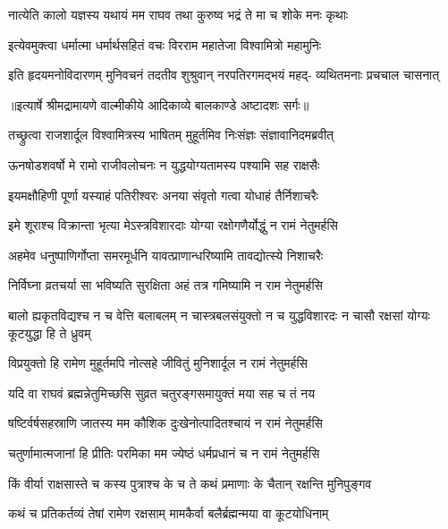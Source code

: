 \twolineshloka
{नात्येति कालो यज्ञस्य यथायं मम राघव}
{तथा कुरुष्व भद्रं ते मा च शोके मनः कृथाः} %

\twolineshloka
{इत्येवमुक्त्वा धर्मात्मा धर्मार्थसहितं वचः}
{विरराम महातेजा विश्वामित्रो महामुनिः} %

\fourlineindentedshloka
{इति हृदयमनोविदारणम्}
{मुनिवचनं तदतीव शुश्रुवान्}
{नरपतिरगमद्भयं महद्-}
{व्यथितमनाः प्रचचाल चासनात्} %


{॥इत्यार्षे श्रीमद्रामायणे वाल्मीकीये आदिकाव्ये बालकाण्डे अष्टादशः सर्गः॥}


\twolineshloka
{तच्छ्रुत्वा राजशार्दूल विश्वामित्रस्य भाषितम्}
{मुहूर्तमिव निःसंज्ञः संज्ञावानिदमब्रवीत्} %

\twolineshloka
{ऊनषोडशवर्षो मे रामो राजीवलोचनः}
{न युद्धयोग्यतामस्य पश्यामि सह राक्षसैः} %

\twolineshloka
{इयमक्षौहिणी पूर्णा यस्याहं पतिरीश्वरः}
{अनया संवृतो गत्वा योधाहं तैर्निशाचरैः} %

\twolineshloka
{इमे शूराश्च विक्रान्ता भृत्या मेऽस्त्रविशारदाः}
{योग्या रक्षोगणैर्योद्धुं न रामं नेतुमर्हसि} %

\twolineshloka
{अहमेव धनुष्पाणिर्गोप्ता समरमूर्धनि}
{यावत्प्राणान्धरिष्यामि तावद्योत्स्ये निशाचरैः} %

\twolineshloka
{निर्विघ्ना व्रतचर्या सा भविष्यति सुरक्षिता}
{अहं तत्र गमिष्यामि न राम नेतुमर्हसि} %

\threelineshloka
{बालो ह्यकृतविद्यश्च न च वेत्ति बलाबलम्}
{न चास्त्रबलसंयुक्तो न च युद्धविशारदः}
{न चासौ रक्षसां योग्यः कूटयुद्धा हि ते ध्रुवम्} %

\twolineshloka
{विप्रयुक्तो हि रामेण मुहूर्तमपि नोत्सहे}
{जीवितुं मुनिशार्दूल न रामं नेतुमर्हसि} %

\twolineshloka
{यदि वा राघवं ब्रह्मन्नेतुमिच्छसि सुव्रत}
{चतुरङ्गसमायुक्तं मया सह च तं नय} %

\twolineshloka
{षष्टिर्वर्षसहस्राणि जातस्य मम कौशिक}
{दुःखेनोत्पादितश्चायं न रामं नेतुमर्हसि} %

\twolineshloka
{चतुर्णामात्मजानां हि प्रीतिः परमिका मम}
{ज्येष्ठं धर्मप्रधानं च न रामं नेतुमर्हसि} %

\twolineshloka
{किं वीर्या राक्षसास्ते च कस्य पुत्राश्च के च ते}
{कथं प्रमाणाः के चैतान् रक्षन्ति मुनिपुङ्गव} %

\twolineshloka
{कथं च प्रतिकर्तव्यं तेषां रामेण रक्षसाम्}
{मामकैर्वा बलैर्ब्रह्मन्मया वा कूटयोधिनाम्} %

